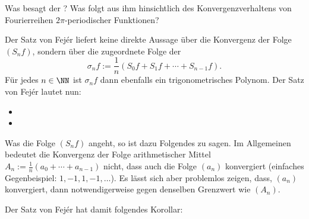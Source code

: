   \begin{frage}\label{07_fejer}
    Was besagt der ? 
    Was folgt aus ihm hinsichtlich des Konvergenzverhaltens 
    von Fourierreihen $2\pi$-periodischer Funktionen?
  \end{frage}

  \begin{antwort}
    Der Satz von Fej\'er liefert keine direkte Aussage über die 
    Konvergenz der Folge $(S_n f)$, sondern über die zugeordnete 
    Folge der  
    \[
    \sigma_n f := \frac{1}{n} ( S_0 f+ S_1 f + \cdots + S_{n-1} f ).
    \]
    Für jedes $n \in\NN$ ist $\sigma_n f$ dann ebenfalls ein 
    trigonometrisches Polynom. Der Satz von Fej\'er lautet nun:
    {\setlength{\labelsep}{3mm}
      \begin{itemize}
      \item[\desc{i}]\;
      \item[\desc{ii}]\;
      \end{itemize}}
    Was die Folge $(S_n f)$ angeht, so ist dazu Folgendes zu sagen. 
    Im Allgemeinen bedeutet die Konvergenz der Folge arithmetischer 
    Mittel $A_n:=\frac{1}{n}(a_0+\cdots + a_{n-1})$ nicht, dass auch 
    die Folge $(a_n)$ konvergiert (einfaches Gegenbeispiel: $1,-1,1,-1,\ldots$). 
    Es lässt sich aber problemlos zeigen, dass,  $(a_n)$ 
    konvergiert, dann notwendigerweise gegen denselben Grenzwert wie $(A_n)$. 

    Der Satz von Fej\'er hat damit folgendes Korollar: 

    \medskip\noindent
     \AntEnd  
  \end{antwort} 


